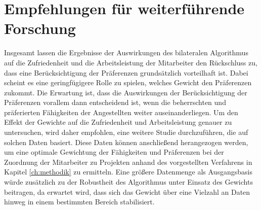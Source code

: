 \section{Empfehlungen für weiterführende Forschung}
Insgesamt lassen die Ergebnisse der Auswirkungen des bilateralen Algorithmus auf die Zufriedenheit und die Arbeitsleistung der Mitarbeiter den Rückschluss zu, dass eine Berücksichtigung der Präferenzen grundsätzlich vorteilhaft ist.
Dabei scheint es eine geringfügigere Rolle zu spielen, welches Gewicht den Präferenzen zukommt.
Die Erwartung ist, dass die Auswirkungen der Berücksichtigung der Präferenzen vorallem dann entscheidend ist, wenn die beherrschten und präferierten Fähigkeiten der Angestellten weiter auseinanderliegen.
Um den Effekt der Gewichte auf die Zufriedenheit und Arbeitsleistung genauer zu untersuchen, wird daher empfohlen, eine weitere Studie durchzuführen, die auf solchen Daten basiert.
Diese Daten können anschließend herangezogen werden, um eine optimale Gewichtung der Fähigkeiten und Präferenzen bei der Zuordnung der Mitarbeiter zu Projekten anhand des vorgestellten Verfahrens in Kapitel \ref{ch:methodik} zu ermitteln.
Eine größere Datenmenge als Ausgangsbasis würde zusätzlich zu der Robustheit des Algorithmus unter Einsatz des Gewichts beitragen, da erwartet wird, dass sich das Gewicht über eine Vielzahl an Daten hinweg in einem bestimmten Bereich stabilisiert.

